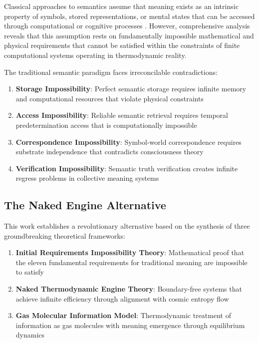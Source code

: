 \documentclass[11pt,a4paper]{article}
\begin{document}
Classical approaches to semantics assume that meaning exists as an intrinsic property of symbols, stored representations, or mental states that can be accessed through computational or cognitive processes \citep{fodor1975language, putnam1975meaning, kripke1980naming}. However, comprehensive analysis reveals that this assumption rests on fundamentally impossible mathematical and physical requirements that cannot be satisfied within the constraints of finite computational systems operating in thermodynamic reality.

The traditional semantic paradigm faces irreconcilable contradictions:

\begin{enumerate}
\item \textbf{Storage Impossibility}: Perfect semantic storage requires infinite memory and computational resources that violate physical constraints
\item \textbf{Access Impossibility}: Reliable semantic retrieval requires temporal predetermination access that is computationally impossible
\item \textbf{Correspondence Impossibility}: Symbol-world correspondence requires substrate independence that contradicts consciousness theory
\item \textbf{Verification Impossibility}: Semantic truth verification creates infinite regress problems in collective meaning systems
\end{enumerate}

\subsection{The Naked Engine Alternative}

This work establishes a revolutionary alternative based on the synthesis of three groundbreaking theoretical frameworks:

\begin{enumerate}
\item \textbf{Initial Requirements Impossibility Theory}: Mathematical proof that the eleven fundamental requirements for traditional meaning are impossible to satisfy \citep{sachikonye2025initial}
\item \textbf{Naked Thermodynamic Engine Theory}: Boundary-free systems that achieve infinite efficiency through alignment with cosmic entropy flow \citep{sachikonye2025naked}
\item \textbf{Gas Molecular Information Model}: Thermodynamic treatment of information as gas molecules with meaning emergence through equilibrium dynamics \citep{sachikonye2025gas}
\end{enumerate}
\end{document}
